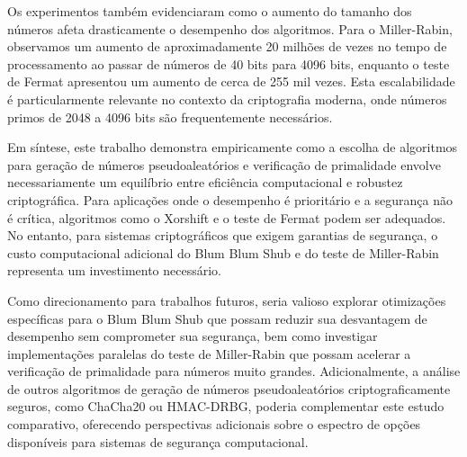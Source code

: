 Os experimentos também evidenciaram como o aumento do tamanho dos números afeta drasticamente o desempenho dos algoritmos. Para o Miller-Rabin, observamos um aumento de aproximadamente 20 milhões de vezes no tempo de processamento ao passar de números de 40 bits para 4096 bits, enquanto o teste de Fermat apresentou um aumento de cerca de 255 mil vezes. Esta escalabilidade é particularmente relevante no contexto da criptografia moderna, onde números primos de 2048 a 4096 bits são frequentemente necessários.

Em síntese, este trabalho demonstra empiricamente como a escolha de algoritmos para geração de números pseudoaleatórios e verificação de primalidade envolve necessariamente um equilíbrio entre eficiência computacional e robustez criptográfica. Para aplicações onde o desempenho é prioritário e a segurança não é crítica, algoritmos como o Xorshift e o teste de Fermat podem ser adequados. No entanto, para sistemas criptográficos que exigem garantias de segurança, o custo computacional adicional do Blum Blum Shub e do teste de Miller-Rabin representa um investimento necessário.

Como direcionamento para trabalhos futuros, seria valioso explorar otimizações específicas para o Blum Blum Shub que possam reduzir sua desvantagem de desempenho sem comprometer sua segurança, bem como investigar implementações paralelas do teste de Miller-Rabin que possam acelerar a verificação de primalidade para números muito grandes. Adicionalmente, a análise de outros algoritmos de geração de números pseudoaleatórios criptograficamente seguros, como ChaCha20 ou HMAC-DRBG, poderia complementar este estudo comparativo, oferecendo perspectivas adicionais sobre o espectro de opções disponíveis para sistemas de segurança computacional.